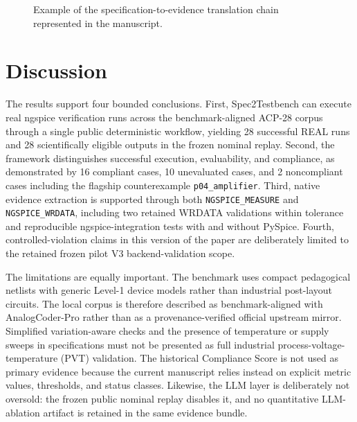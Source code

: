 \documentclass[conference]{IEEEtran}%
\begin{document}
\begin{figure}[t]
\centering
{}
\caption{Example of the specification-to-evidence translation chain represented in the manuscript.}
\label{fig:spec_to_evidence}
\end{figure}

\section{Discussion}
The results support four bounded conclusions. First, Spec2Testbench can execute real ngspice verification runs across the benchmark-aligned ACP-28 corpus through a single public deterministic workflow, yielding 28 successful REAL runs and 28 scientifically eligible outputs in the frozen nominal replay. Second, the framework distinguishes successful execution, evaluability, and compliance, as demonstrated by 16 compliant cases, 10 unevaluated cases, and 2 noncompliant cases including the flagship counterexample \texttt{p04\_amplifier}. Third, native evidence extraction is supported through both \texttt{NGSPICE\_MEASURE} and \texttt{NGSPICE\_WRDATA}, including two retained WRDATA validations within tolerance and reproducible ngspice-integration tests with and without PySpice. Fourth, controlled-violation claims in this version of the paper are deliberately limited to the retained frozen pilot V3 backend-validation scope.

The limitations are equally important. The benchmark uses compact pedagogical netlists with generic Level-1 device models rather than industrial post-layout circuits. The local corpus is therefore described as benchmark-aligned with AnalogCoder-Pro rather than as a provenance-verified official upstream mirror. Simplified variation-aware checks and the presence of temperature or supply sweeps in specifications must not be presented as full industrial process-voltage-temperature (PVT) validation. The historical Compliance Score is not used as primary evidence because the current manuscript relies instead on explicit metric values, thresholds, and status classes. Likewise, the LLM layer is deliberately not oversold: the frozen public nominal replay disables it, and no quantitative LLM-ablation artifact is retained in the same evidence bundle.
\end{document}
